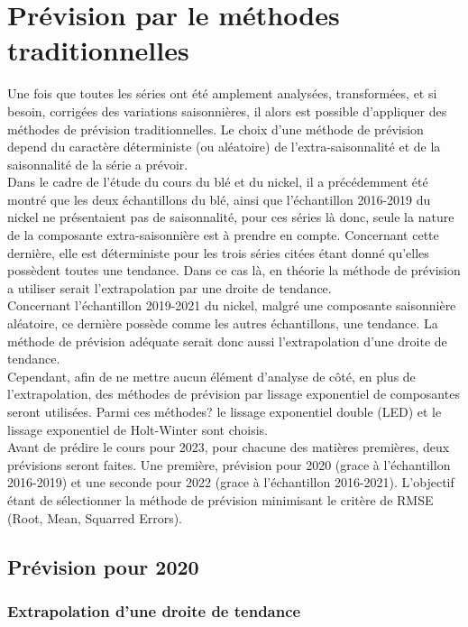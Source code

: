 \section{Prévision par le méthodes traditionnelles}
Une fois que toutes les séries ont été amplement analysées, transformées, et si besoin, corrigées des variations saisonnières, il alors est possible d'appliquer des 
méthodes de prévision traditionnelles. Le choix d'une méthode de prévision depend du caractère déterministe (ou aléatoire) de l'extra-saisonnalité et de la saisonnalité de
la série a prévoir. \\[11pt]
Dans le cadre de l'étude du cours du blé et du nickel, il a précédemment été montré que les deux échantillons du blé, ainsi que l'échantillon 2016-2019 
du nickel ne présentaient pas de saisonnalité, pour ces séries là donc, seule la nature de la composante extra-saisonnière est à prendre en compte. Concernant cette 
dernière, elle est déterministe pour les trois séries citées étant donné qu'elles possèdent toutes une tendance. Dans ce cas là, en théorie la méthode de prévision a 
utiliser serait l'extrapolation par une droite de tendance.\\[11pt]
Concernant l'échantillon 2019-2021 du nickel, malgré une composante saisonnière aléatoire, ce dernière possède comme les autres échantillons, une tendance. La méthode de 
prévision adéquate serait donc aussi l'extrapolation d'une droite de tendance.\\[11pt]
Cependant, afin de ne mettre aucun élément d'analyse de côté, en plus de l'extrapolation, des méthodes de prévision par lissage exponentiel de composantes seront 
utilisées. Parmi ces méthodes? le lissage exponentiel double (LED) et le lissage exponentiel de Holt-Winter sont choisis. \\[11pt]
Avant de prédire le cours pour 2023, pour chacune des matières premières, deux prévisions seront faites. Une première, prévision pour 2020 (grace à l'échantillon 2016-2019)
et une seconde pour 2022 (grace à l'échantillon 2016-2021). L'objectif étant de sélectionner la méthode de prévision minimisant le critère de RMSE (Root, Mean, Squarred 
Errors).
\subsection{Prévision pour 2020}
\subsubsection{Extrapolation d'une droite de tendance}

